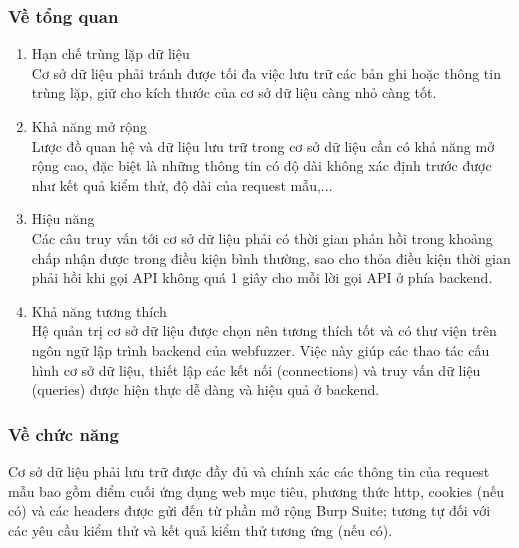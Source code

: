 \subsubsection{Về tổng quan}
\begin{enumerate}
    \item Hạn chế trùng lặp dữ liệu\\
    Cơ sở dữ liệu phải tránh được tối đa việc lưu trữ các bản ghi hoặc thông tin trùng lặp, giữ cho kích thước của cơ sở dữ liệu càng nhỏ càng tốt.
    \item Khả năng mở rộng\\
    Lược đồ quan hệ và dữ liệu lưu trữ trong cơ sở dữ liệu cần có khả năng mở rộng cao, đặc biệt là những thông tin có độ dài không xác định trước được như kết quả kiểm thử, độ dài của request mẫu,...
    \item Hiệu năng\\
    Các câu truy vấn tới cơ sở dữ liệu phải có thời gian phản hồi trong khoảng chấp nhận được trong điều kiện bình thường, sao cho thỏa điều kiện thời gian phải hồi khi gọi API không quá 1 giây cho mỗi lời gọi API ở phía backend.
    \item Khả năng tương thích\\
    Hệ quản trị cơ sở dữ liệu được chọn nên tương thích tốt và có thư viện trên ngôn ngữ lập trình backend của webfuzzer. Việc này giúp các thao tác cấu hình cơ sở dữ liệu, thiết lập các kết nối (connections) và truy vấn dữ liệu (queries) được hiện thực dễ dàng và hiệu quả ở backend.
\end{enumerate}
\subsubsection{Về chức năng}
Cơ sở dữ liệu phải lưu trữ được đầy đủ và chính xác các thông tin của request mẫu bao gồm điểm cuối ứng dụng web mục tiêu, phương thức \acrshort{http}, cookies (nếu có) và các headers được gửi đến từ phần mở rộng Burp Suite; tương tự đối với các yêu cầu kiểm thử và kết quả kiểm thử tương ứng (nếu có).
